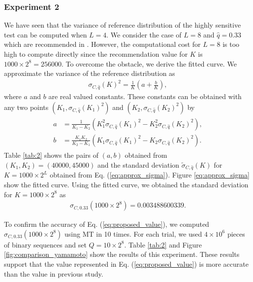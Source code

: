 \documentclass[dvipdfmx,english]{ampmt} %
\begin{document}
\subsubsection{Experiment 2}\label{subsec:4-3}
We have seen that the variance of reference distribution of the highly sensitive test can be computed when $L=4$. We consider the case of $L=8$ and $\hat{q}=0.33$ which are recommended in \cite{yamamoto2016highly}. 
However, the computational cost for $L=8$ is too high to compute directly since the recommendation value for $K$ is $1000\times 2^8 = 256000$.
To overcome the obstacle, we derive the fitted curve. 
We approximate the variance of the reference distribution as
\begin{align}\label{eq:approx_sigma}
  \sigma_{C,\hat{q}}(K)^2 = \frac{1}{K} \left( a + \frac{b}{K} \right),
\end{align}
where $a$ and $b$ are real valued constants. 
These constants can be obtained with any two points $(K_1, \sigma_{C,\hat{q}}(K_1)^2)$ and $(K_2, \sigma_{C,\hat{q}}(K_2)^2)$ by
\begin{align}\begin{split}\label{eq:keisuu_ab}
  a &= \frac{1}{K_1-K_2} \left( K_1^2 \sigma_{C,\hat{q}}(K_1)^2 - K_2^2 \sigma_{C,\hat{q}}(K_2)^2  \right), \\
  b &= \frac{K_1K_2}{K_2-K_1} \left( K_1 \sigma_{C,\hat{q}}(K_1)^2 - K_2 \sigma_{C,\hat{q}}(K_2)^2 \right).
\end{split}\end{align}
%
Table \ref{tab:2} shows the pairs of $(a,b)$ obtained from $(K_1,K_2)=(40000,45000)$ and the standard deviation $\tilde{\sigma}_{C,\hat{q}}(K)$ for $K=1000\times2^L$ obtained from Eq. (\ref{eq:approx_sigma}).
%
Figure \ref{eq:approx_sigma} show the fitted curve.
Using the fitted curve, we obtained the standard deviation for $K=1000\times 2^8$ as
\begin{align}\label{eq:proposed_value}
  \sigma_{C,0.33} (1000\times 2^8) = 0.003488600339.
\end{align}
%
%
\par
To confirm the accuracy of Eq. (\ref{eq:proposed_value}), we computed $\sigma_{C,0.33} (1000\times 2^8)$ using MT in 10 times. For each trial, we used $4\times 10^6$ pieces of binary sequences and set $Q=10\times 2^8$.
Table \ref{tab:2} and Figure \ref{fig:comparison_yamamoto} show the results of this experiment.
These results support that the value represented in Eq. (\ref{eq:proposed_value}) is more accurate than the value in previous study.
%
\end{document}
